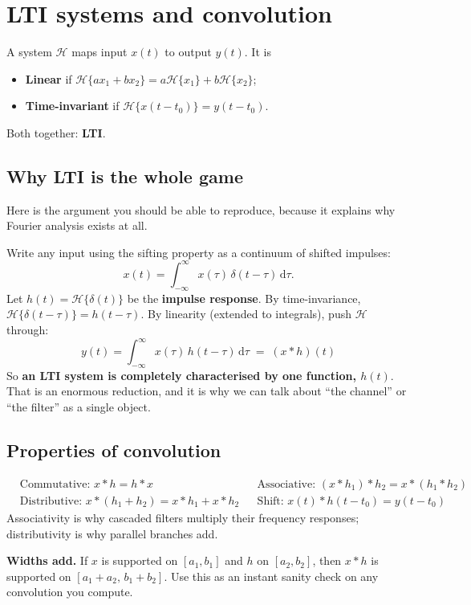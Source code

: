 \documentclass[11pt,a4paper]{article}
\newcommand{\dd}{\,\mathrm{d}}
\begin{document}
\section{LTI systems and convolution}

A system $\mathcal{H}$ maps input $x(t)$ to output $y(t)$. It is
\begin{itemize}[nosep,leftmargin=*]
\item \textbf{Linear} if $\mathcal{H}\{a x_1+b x_2\}=a\mathcal{H}\{x_1\}+b\mathcal{H}\{x_2\}$;
\item \textbf{Time-invariant} if $\mathcal{H}\{x(t-t_0)\}=y(t-t_0)$.
\end{itemize}
Both together: \textbf{LTI}.

\subsection{Why LTI is the whole game}
Here is the argument you should be able to reproduce, because it explains why Fourier analysis exists at all.

Write any input using the sifting property as a continuum of shifted impulses:
\[
x(t)=\int_{-\infty}^{\infty}x(\tau)\,\delta(t-\tau)\dd\tau .
\]
Let $h(t)=\mathcal{H}\{\delta(t)\}$ be the \textbf{impulse response}. By time-invariance,
$\mathcal{H}\{\delta(t-\tau)\}=h(t-\tau)$. By linearity (extended to integrals), push $\mathcal H$ through:
\[
\boxed{\;y(t)=\int_{-\infty}^{\infty}x(\tau)\,h(t-\tau)\dd\tau \;=\; (x*h)(t)\;}
\]
So \textbf{an LTI system is completely characterised by one function, $h(t)$}. That is an enormous reduction,
and it is why we can talk about ``the channel'' or ``the filter'' as a single object.

\subsection{Properties of convolution}
\begin{align*}
&\text{Commutative: } x*h=h*x
&&\text{Associative: } (x*h_1)*h_2=x*(h_1*h_2)\\
&\text{Distributive: } x*(h_1+h_2)=x*h_1+x*h_2
&&\text{Shift: } x(t)*h(t-t_0)=y(t-t_0)
\end{align*}
Associativity is why cascaded filters multiply their frequency responses; distributivity is why parallel
branches add.

\textbf{Widths add.} If $x$ is supported on $[a_1,b_1]$ and $h$ on $[a_2,b_2]$, then $x*h$ is supported on
$[a_1+a_2,\,b_1+b_2]$. Use this as an instant sanity check on any convolution you compute.
\end{document}
